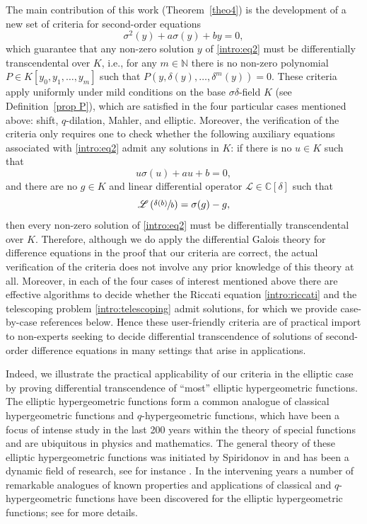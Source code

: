 \documentclass[11pt]{article}
\newcommand{\ie}{i.e.,\xspace}
\numberwithin{equation}{section}\providecommand{\loccit}{\textit{loc.\ cit.}}
\let\mathcal\mathscr
\theoremstyle{definition}
\begin{document}
The main contribution of this work (Theorem~\ref{theo4}) is the development of a new set of criteria for second-order equations
\begin{equation}\label{intro:eq2} \sigma^2(y)+a\sigma(y)+by=0,\end{equation}
which guarantee that any non-zero solution $y$ of \eqref{intro:eq2} must be differentially transcendental over $K$, \ie for any $m\in\mathbb{N}$ there is no non-zero polynomial $P\in K[y_0,y_1,\dots,y_m]$ such that $P(y,\delta(y),\dots,\delta^m(y))=0$. These criteria apply uniformly under mild conditions on the base $\sigma\delta$-field $K$ (see Definition~\ref{prop P}), which are satisfied in the four particular cases mentioned above: shift, $q$-dilation, Mahler, and elliptic. Moreover, the verification of the criteria only requires one to check whether the following auxiliary equations associated with \eqref{intro:eq2} admit any solutions in $K$: if there is no $u\in K$ such that
\begin{equation}\label{intro:riccati} u\sigma(u)+au+b=0,
\end{equation}
and there are no $g\in K$ and linear differential operator $\mathcal{L}\in\mathbb{C}[\delta]$ such that
\begin{equation}\label{intro:telescoping} \mathcal{L}\left(\sfrac{\delta(b)}{b}\right)=\sigma(g)-g,
\end{equation}
then every non-zero solution of \eqref{intro:eq2} must be differentially transcendental over $K$. Therefore, although we do apply the differential Galois theory for difference equations \cite{HS} in the proof that our criteria are correct, the actual verification of the criteria does not involve any prior knowledge of this theory at all. Moreover, in each of the four cases of interest mentioned above there are effective algorithms to decide whether the Riccati equation \eqref{intro:riccati} and the telescoping problem \eqref{intro:telescoping} admit solutions, for which we provide case-by-case references below. Hence these user-friendly criteria are of practical import to non-experts seeking to decide differential transcendence of solutions of second-order difference equations in many settings that arise in applications.\enlargethispage{.5\baselineskip}%

Indeed, we illustrate the practical applicability of our criteria in the elliptic case by proving differential transcendence of ``most'' elliptic hypergeometric functions. The elliptic hypergeometric functions form a common analogue of classical hypergeometric functions and $q$-hypergeometric functions, which have been a focus of intense study in the last 200 years within the theory of special functions and are ubiquitous in physics and mathematics. The general theory of these elliptic hypergeometric functions was initiated by Spiridonov in \cite{spiridonov2016elliptic} and has been a dynamic field of research, see for instance \cite{van2007hyperbolic,fokko2009basic,
magnus2009elliptic,rains2010transformations,
rosengren2002elliptic}. In the intervening years a number of remarkable analogues of known properties and applications of classical and $q$-hypergeometric functions have been discovered for the elliptic hypergeometric functions; see \cite{spiridonov2016elliptic} for more details.
\end{document}
